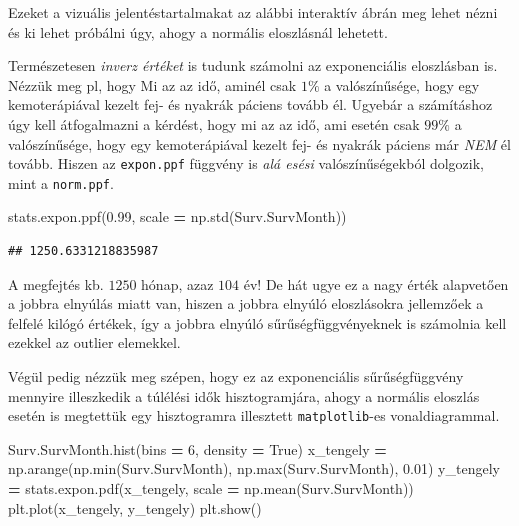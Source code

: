 \documentclass[
]{book}
\newenvironment{Shaded}{\begin{snugshade}}{\end{snugshade}}
\newcommand{\BuiltInTok}[1]{#1}
\newcommand{\DecValTok}[1]{\textcolor[rgb]{0.00,0.00,0.81}{#1}}
\newcommand{\FloatTok}[1]{\textcolor[rgb]{0.00,0.00,0.81}{#1}}
\newcommand{\NormalTok}[1]{#1}
\newcommand{\OperatorTok}[1]{\textcolor[rgb]{0.81,0.36,0.00}{\textbf{#1}}}
\newcommand{\VariableTok}[1]{\textcolor[rgb]{0.00,0.00,0.00}{#1}}
\begin{document}
Ezeket a vizuális jelentéstartalmakat az alábbi interaktív ábrán meg lehet nézni és ki lehet próbálni úgy, ahogy a normális eloszlásnál lehetett.

Természetesen \emph{inverz értéket} is tudunk számolni az exponenciális eloszlásban is. Nézzük meg pl, hogy Mi az az idő, aminél csak \(1\%\) a valószínűsége, hogy egy kemoterápiával kezelt fej- és nyakrák páciens tovább él.
Ugyebár a számításhoz úgy kell átfogalmazni a kérdést, hogy mi az az idő, ami esetén csak \(99\%\) a valószínűsége, hogy egy kemoterápiával kezelt fej- és nyakrák páciens már \emph{NEM} él tovább. Hiszen az \texttt{expon.ppf} függvény is \emph{alá esési} valószínűségekból dolgozik, mint a \texttt{norm.ppf}.

\begin{Shaded}
\begin{Highlighting}[]
\NormalTok{stats.expon.ppf(}\FloatTok{0.99}\NormalTok{, scale }\OperatorTok{=}\NormalTok{ np.std(Surv.SurvMonth))}
\end{Highlighting}
\end{Shaded}

\begin{verbatim}
## 1250.6331218835987
\end{verbatim}

A megfejtés kb. \(1250\) hónap, azaz \(104\) év! De hát ugye ez a nagy érték alapvetően a jobbra elnyúlás miatt van, hiszen a jobbra elnyúló eloszlásokra jellemzőek a felfelé kilógó értékek, így a jobbra elnyúló sűrűségfüggvényeknek is számolnia kell ezekkel az outlier elemekkel.

Végül pedig nézzük meg szépen, hogy ez az exponenciális sűrűségfüggvény mennyire illeszkedik a túlélési idők hisztogramjára, ahogy a normális eloszlás esetén is megtettük egy hisztogramra illesztett \texttt{matplotlib}-es vonaldiagrammal.

\begin{Shaded}
\begin{Highlighting}[]
\NormalTok{Surv.SurvMonth.hist(bins }\OperatorTok{=} \DecValTok{6}\NormalTok{, density }\OperatorTok{=} \VariableTok{True}\NormalTok{)}
\NormalTok{x\_tengely }\OperatorTok{=}\NormalTok{ np.arange(np.}\BuiltInTok{min}\NormalTok{(Surv.SurvMonth), np.}\BuiltInTok{max}\NormalTok{(Surv.SurvMonth), }\FloatTok{0.01}\NormalTok{)}
\NormalTok{y\_tengely }\OperatorTok{=}\NormalTok{ stats.expon.pdf(x\_tengely, scale }\OperatorTok{=}\NormalTok{ np.mean(Surv.SurvMonth))}
\NormalTok{plt.plot(x\_tengely, y\_tengely)}
\NormalTok{plt.show()}
\end{Highlighting}
\end{Shaded}
\end{document}
